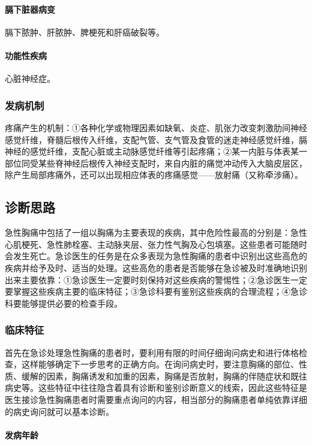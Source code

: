 \paragraph{膈下脏器病变}

膈下脓肿、肝脓肿、脾梗死和肝癌破裂等。

\paragraph{功能性疾病}

心脏神经症。

\subsubsection{发病机制}

疼痛产生的机制：①各种化学或物理因素如缺氧、炎症、肌张力改变刺激肋间神经感觉纤维，脊髓后根传入纤维，支配气管、支气管及食管的迷走神经感觉纤维，膈神经的感觉纤维，支配心脏或主动脉感觉纤维等引起疼痛；②某一内脏与体表某一部位同受某些脊神经后根传入神经支配时，来自内脏的痛觉冲动传入大脑皮层区，除产生局部疼痛外，还可以出现相应体表的疼痛感觉------放射痛（又称牵涉痛）。

\subsection{诊断思路}

急性胸痛中包括了一组以胸痛为主要表现的疾病，其中危险性最高的分别是：急性心肌梗死、急性肺栓塞、主动脉夹层、张力性气胸及心包填塞。这些患者可能随时会发生死亡。急诊医生的任务是在众多表现为急性胸痛的患者中识别出这些高危的疾病并给予及时、适当的处理。这些高危的患者是否能够在急诊被及时准确地识别出来主要依靠：①急诊医生一定要时刻保持对这些疾病的警惕性；②急诊医生一定要掌握这些疾病主要的临床特征；③急诊科要有鉴别这些疾病的合理流程；④急诊科要能够提供必要的检查手段。

\subsubsection{临床特征}

首先在急诊处理急性胸痛的患者时，要利用有限的时间仔细询问病史和进行体格检查，这样能够确定下一步思考的正确方向。在询问病史时，要注意胸痛的部位、性质、缓解的因素，胸痛诱发和加重的因素，胸痛是否放射，胸痛的伴随症状和既往病史等。这些特征中往往隐含着具有诊断和鉴别诊断意义的线索，因此这些特征是医生接诊急性胸痛患者时需要重点询问的内容，相当部分的胸痛患者单纯依靠详细的病史询问就可以基本诊断。

\paragraph{发病年龄}

